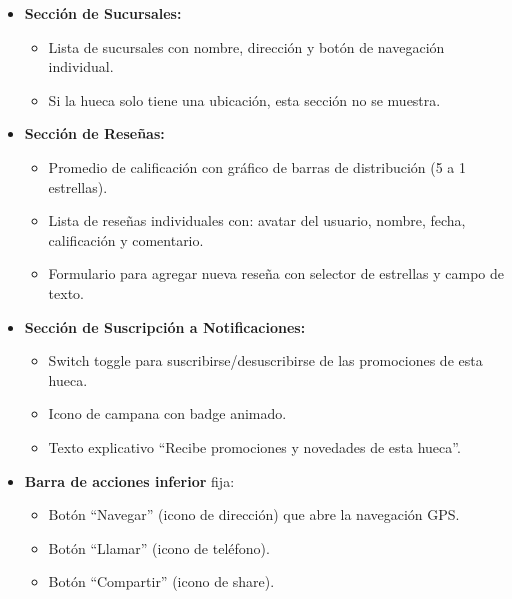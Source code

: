 \documentclass[11pt, a4paper, oneside]{report}
\begin{document}
\begin{itemize}
\begin{itemize}
    \item Lista de platos organizados por categoría (Entradas, Platos Fuertes, Bebidas, Postres).
    \item Cada plato muestra: nombre (ES/EN), descripción, precio y foto opcional.
    \item Botón de toggle para ver el menú en inglés (para turistas).
  \end{itemize}
  \item \textbf{Sección de Sucursales:}
  \begin{itemize}
    \item Lista de sucursales con nombre, dirección y botón de navegación individual.
    \item Si la hueca solo tiene una ubicación, esta sección no se muestra.
  \end{itemize}
  \item \textbf{Sección de Reseñas:}
  \begin{itemize}
    \item Promedio de calificación con gráfico de barras de distribución (5 a 1 estrellas).
    \item Lista de reseñas individuales con: avatar del usuario, nombre, fecha, calificación y comentario.
    \item Formulario para agregar nueva reseña con selector de estrellas y campo de texto.
  \end{itemize}
  \item \textbf{Sección de Suscripción a Notificaciones:}
  \begin{itemize}
    \item Switch toggle para suscribirse/desuscribirse de las promociones de esta hueca.
    \item Icono de campana con badge animado.
    \item Texto explicativo ``Recibe promociones y novedades de esta hueca''.
  \end{itemize}
  \item \textbf{Barra de acciones inferior} fija:
  \begin{itemize}
    \item Botón ``Navegar'' (icono de dirección) que abre la navegación GPS.
    \item Botón ``Llamar'' (icono de teléfono).
    \item Botón ``Compartir'' (icono de share).
  \end{itemize}
\end{itemize}
\end{document}
